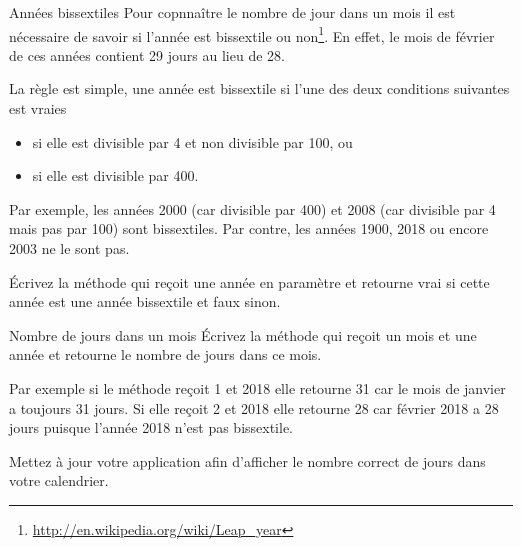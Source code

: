 \documentclass[a4paper,11pt]{article}
\begin{document}
 	\begin{Exercice}{Années bissextiles}
	 Pour copnnaître le nombre de jour dans un mois il est nécessaire de savoir 
	 si l'année est bissextile ou non\footnote{\url{http://en.wikipedia.org/wiki/Leap_year}}. 
	 En effet, le mois de février de ces années contient 29 jours au lieu de 28. 
	 
	 La règle est simple, une année est bissextile si l'une des deux conditions suivantes est vraies
		\begin{itemize}
			\item si elle est divisible par 4 et non divisible par 100, ou
			\item si elle est divisible par 400.
		\end{itemize}
		
		Par exemple, les années 2000 (car divisible par 400) et 2008 (car divisible par 4 mais pas par 100)
		 sont bissextiles.
		 Par contre, les années 1900, 2018 ou encore 2003 ne le sont pas.

		\'Ecrivez la méthode  qui reçoit une année en paramètre et 
		retourne vrai si cette année est une année bissextile et faux sinon.

	\end{Exercice} 



 	\begin{Exercice}{Nombre de jours dans un mois}
		\'Ecrivez la méthode  qui reçoit un mois et une année et 
		retourne le nombre de jours dans ce mois.
		
		Par exemple si le méthode reçoit 1 et 2018 elle retourne 31 car le mois de janvier a toujours 31 jours.
		Si elle reçoit 2 et 2018 elle retourne 28 car février 2018 a 28 jours puisque l'année 2018 n'est pas bissextile.
		
		Mettez à jour votre application afin d'afficher le nombre correct de jours dans votre calendrier.
	\end{Exercice} 
\end{document}
